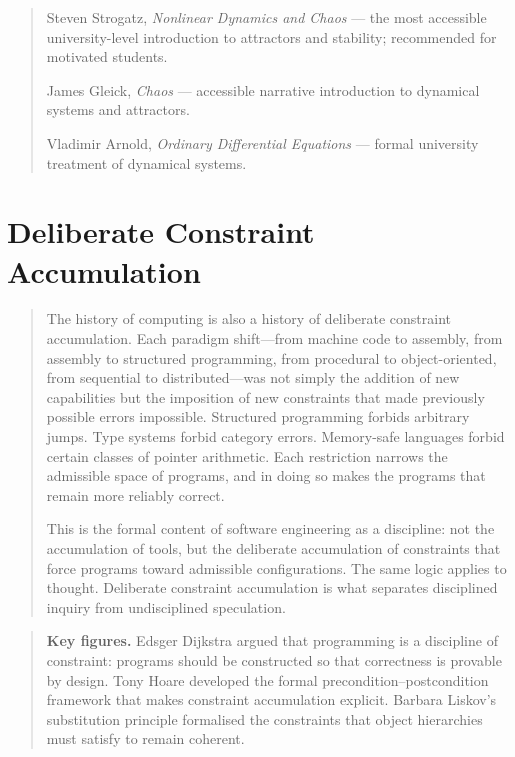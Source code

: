 \documentclass[11pt]{book}
\theoremstyle{plain}
\theoremstyle{definition}
\theoremstyle{remark}
\newenvironment{historicalpreamble}
  {\begin{quote}\small}
  {\end{quote}}
\newenvironment{historicalfigures}
  {\begin{quote}\small\textbf{Key figures.}\enspace\ignorespaces}
  {\end{quote}}
\newenvironment{readinglist}
  {\begin{quote}\small}
  {\end{quote}}
\begin{document}
\begin{readinglist}
Steven Strogatz, \textit{Nonlinear Dynamics and Chaos} --- the most
accessible university-level introduction to attractors and stability;
recommended for motivated students.

James Gleick, \textit{Chaos} --- accessible narrative introduction to
dynamical systems and attractors.

Vladimir Arnold, \textit{Ordinary Differential Equations} --- formal
university treatment of dynamical systems.
\end{readinglist}

\chapter{Deliberate Constraint Accumulation}

\begin{historicalpreamble}
The history of computing is also a history of deliberate constraint
accumulation. Each paradigm shift---from machine code to assembly, from
assembly to structured programming, from procedural to object-oriented,
from sequential to distributed---was not simply the addition of new
capabilities but the imposition of new constraints that made previously
possible errors impossible. Structured programming forbids arbitrary
jumps. Type systems forbid category errors. Memory-safe languages forbid
certain classes of pointer arithmetic. Each restriction narrows the
admissible space of programs, and in doing so makes the programs that
remain more reliably correct.

This is the formal content of software engineering as a discipline: not
the accumulation of tools, but the deliberate accumulation of constraints
that force programs toward admissible configurations. The same logic
applies to thought. Deliberate constraint accumulation is what separates
disciplined inquiry from undisciplined speculation.
\end{historicalpreamble}

\begin{historicalfigures}
Edsger Dijkstra argued that programming is a discipline of constraint:
programs should be constructed so that correctness is provable by
design. Tony Hoare developed the formal precondition--postcondition
framework that makes constraint accumulation explicit. Barbara Liskov's
substitution principle formalised the constraints that object hierarchies
must satisfy to remain coherent.
\end{historicalfigures}
\end{document}
